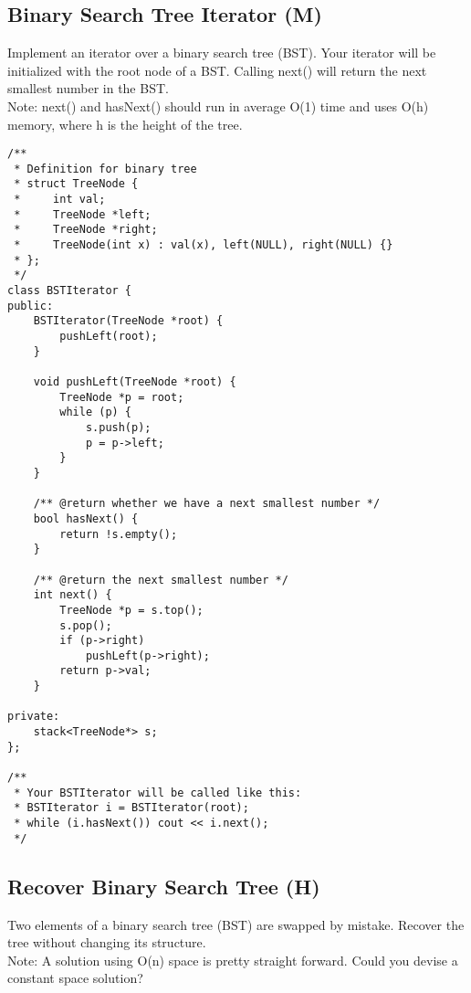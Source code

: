 \subsection{Binary Search Tree Iterator (M)}
Implement an iterator over a binary search tree (BST). Your iterator will be initialized with the root node of a BST. Calling next() will return the next smallest number in the BST.\\

Note: next() and hasNext() should run in average O(1) time and uses O(h) memory, where h is the height of the tree. \\

\begin{lstlisting}
/**
 * Definition for binary tree
 * struct TreeNode {
 *     int val;
 *     TreeNode *left;
 *     TreeNode *right;
 *     TreeNode(int x) : val(x), left(NULL), right(NULL) {}
 * };
 */
class BSTIterator {
public:
    BSTIterator(TreeNode *root) {
        pushLeft(root);
    }
    
    void pushLeft(TreeNode *root) {
        TreeNode *p = root;
        while (p) {
            s.push(p);
            p = p->left;
        }
    }

    /** @return whether we have a next smallest number */
    bool hasNext() {
        return !s.empty();
    }

    /** @return the next smallest number */
    int next() {
        TreeNode *p = s.top();
        s.pop();
        if (p->right)
            pushLeft(p->right);
        return p->val;
    }
    
private:
    stack<TreeNode*> s;
};

/**
 * Your BSTIterator will be called like this:
 * BSTIterator i = BSTIterator(root);
 * while (i.hasNext()) cout << i.next();
 */
\end{lstlisting}


\subsection{Recover Binary Search Tree (H)}
Two elements of a binary search tree (BST) are swapped by mistake. Recover the tree without changing its structure.\\

Note: A solution using O(n) space is pretty straight forward. Could you devise a constant space solution? \\

